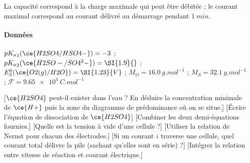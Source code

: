    La  capacité  correspond  à  la  charge  maximale  qui  peut  être  débitée ;  le  courant  maximal  correspond  au  courant  délivré  au démarrage pendant $\SI{1}{min}$.

    \paragraph{Données}
    ${pK_a}_1(\ce{H2SO4/HSO4-})=-3$ ;
    ${pK_a}_2(\ce{H2SO-/SO4^2-})=\SI{1.9}{}$ ;
    $E^0_3(\ce{O2(g)/H2O})=\SI{1.23}{V}$ ;
    $M_O = \SI{16.0}{g.mol^{-1}}$ ;
    $M_S=\SI{32.1}{g.mol^{-1}}$ ;
    $\mathcal{F} = \SI{9.65e4}{C.mol^{-1}}$
    
    \begin{enumerate}
        [$\ce{H2SO4}$ peut-il exister dans l'eau ? En déduire la concentration minimale de $\ce{H+}$ puis la zone du diagramme de prédominance où on se situe.]
        [Écrire l'équation de dissociation de $\ce{H2SO4}$]
        [Combiner les deux demi-équations fournies.]
        [Quelle est la tension à vide d'une cellule ?]
        [Utiliser la relation de Nernst pour chacun des électrodes.]
        [Si un courant $i$ traverse une cellule, quel courant total délivre la pile (sachant qu'elles sont en série) ?]
        [Intégrer la relation entre vitesse de réaction et courant électrique.]
    \end{enumerate}
    